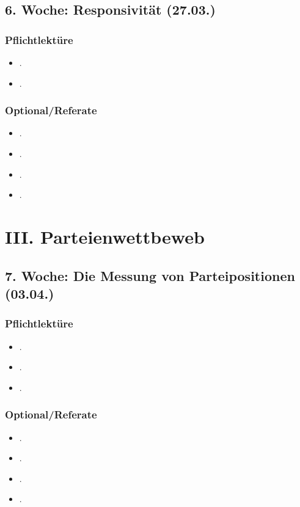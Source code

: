 \documentclass[abstract=on,parskip=full,headings=standardclasses,fontsize=11pt,paper=a4]{scrartcl}
\begin{document}
\subsection{6. Woche: Responsivität (27.03.)}

\subsubsection*{Pflichtlektüre}
\begin{itemize}
\item {}.
\item {}.
\end{itemize}

\subsubsection*{Optional/Referate}
\begin{itemize}
\item {}.
\item {}.
\item {}.
\item {}.
\end{itemize}



\section{III. Parteienwettbeweb}



\subsection{7. Woche: Die Messung von Parteipositionen (03.04.)}

\subsubsection*{Pflichtlektüre}
\begin{itemize}
\item {}.
\item {}.
\item {}.
\end{itemize}


\subsubsection*{Optional/Referate}
\begin{itemize}
\item {}.
\item {}.
\item {}.
\item {}.
\end{itemize}
\end{document}
